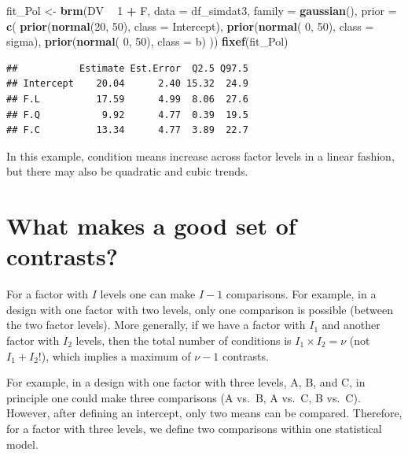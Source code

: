 \documentclass[12pt,]{krantz}
\newenvironment{Shaded}{\begin{snugshade}}{\end{snugshade}}
\newcommand{\DataTypeTok}[1]{\textcolor[rgb]{0.13,0.29,0.53}{#1}}
\newcommand{\DecValTok}[1]{\textcolor[rgb]{0.00,0.00,0.81}{#1}}
\newcommand{\KeywordTok}[1]{\textcolor[rgb]{0.13,0.29,0.53}{\textbf{#1}}}
\newcommand{\NormalTok}[1]{#1}
\newcommand{\OperatorTok}[1]{\textcolor[rgb]{0.81,0.36,0.00}{\textbf{#1}}}
\newcommand{\StringTok}[1]{\textcolor[rgb]{0.31,0.60,0.02}{#1}}
\theoremstyle{definition}
\theoremstyle{definition}
\theoremstyle{definition}
\theoremstyle{remark}
\begin{document}
\begin{Shaded}
\begin{Highlighting}[]
\NormalTok{fit_Pol <-}\StringTok{ }\KeywordTok{brm}\NormalTok{(DV }\OperatorTok{~}\StringTok{ }\DecValTok{1} \OperatorTok{+}\StringTok{ }\NormalTok{F,}
                 \DataTypeTok{data =}\NormalTok{ df_simdat3,}
                 \DataTypeTok{family =} \KeywordTok{gaussian}\NormalTok{(),}
                 \DataTypeTok{prior =} \KeywordTok{c}\NormalTok{(}
                     \KeywordTok{prior}\NormalTok{(}\KeywordTok{normal}\NormalTok{(}\DecValTok{20}\NormalTok{, }\DecValTok{50}\NormalTok{), }\DataTypeTok{class =}\NormalTok{ Intercept),}
                     \KeywordTok{prior}\NormalTok{(}\KeywordTok{normal}\NormalTok{( }\DecValTok{0}\NormalTok{, }\DecValTok{50}\NormalTok{), }\DataTypeTok{class =}\NormalTok{ sigma),}
                     \KeywordTok{prior}\NormalTok{(}\KeywordTok{normal}\NormalTok{( }\DecValTok{0}\NormalTok{, }\DecValTok{50}\NormalTok{), }\DataTypeTok{class =}\NormalTok{ b)}
\NormalTok{                 )) }
\KeywordTok{fixef}\NormalTok{(fit_Pol)}
\end{Highlighting}
\end{Shaded}

\begin{verbatim}
##           Estimate Est.Error  Q2.5 Q97.5
## Intercept    20.04      2.40 15.32  24.9
## F.L          17.59      4.99  8.06  27.6
## F.Q           9.92      4.77  0.39  19.5
## F.C          13.34      4.77  3.89  22.7
\end{verbatim}

In this example, condition means increase across factor levels in a linear fashion, but there may also be quadratic and cubic trends.

\hypertarget{nonOrthogonal}{%
\section{What makes a good set of contrasts?}\label{nonOrthogonal}}

For a factor with \(I\) levels one can make \(I-1\) comparisons. For example, in a design with one factor with two levels, only one comparison is possible (between the two factor levels). More generally, if we have a factor with \(I_1\) and another factor with \(I_2\) levels, then the total number of conditions is \(I_1\times I_2 = \nu\) (not \(I_1 + I_2\)!), which implies a maximum of \(\nu-1\) contrasts.

For example, in a design with one factor with three levels, A, B, and C, in principle one could make three comparisons (A vs.~B, A vs.~C, B vs.~C).
However, after defining an intercept, only two means can be compared. Therefore, for a factor with three levels, we define two comparisons within one statistical model.
\end{document}
